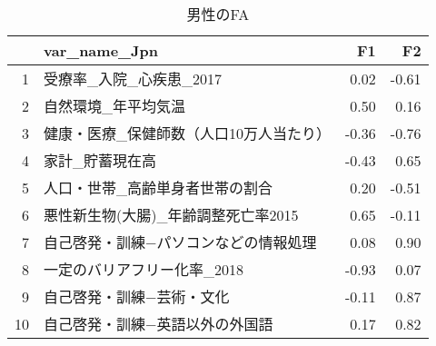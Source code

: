 \begin{table}[ht]
\centering
\caption{男性のFA} 
\label{FAm}
\begingroup\tiny
\begin{tabular}{rlrr}
  \hline
 & var\_name\_Jpn & F1 & F2 \\ 
  \hline
1 & 受療率\_入院\_心疾患\_2017 & 0.02 & -0.61 \\ 
  2 & 自然環境\_年平均気温 & 0.50 & 0.16 \\ 
  3 & 健康・医療\_保健師数（人口10万人当たり） & -0.36 & -0.76 \\ 
  4 & 家計\_貯蓄現在高 & -0.43 & 0.65 \\ 
  5 & 人口・世帯\_高齢単身者世帯の割合 & 0.20 & -0.51 \\ 
  6 & 悪性新生物(大腸)\_年齢調整死亡率2015 & 0.65 & -0.11 \\ 
  7 & 自己啓発・訓練−パソコンなどの情報処理 & 0.08 & 0.90 \\ 
  8 & 一定のバリアフリー化率\_2018 & -0.93 & 0.07 \\ 
  9 & 自己啓発・訓練−芸術・文化 & -0.11 & 0.87 \\ 
  10 & 自己啓発・訓練−英語以外の外国語 & 0.17 & 0.82 \\ 
   \hline
\end{tabular}
\endgroup
\end{table}
